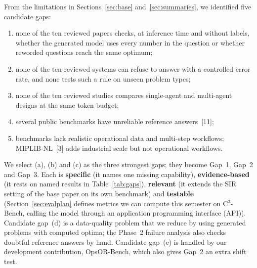 \documentclass[11pt,a4paper]{article}
\newcommand{\cthree}{C$^3$-Bench}
\begin{document}
From the limitations in Sections~\ref{sec:base} and~\ref{sec:summaries}, we identified five candidate gaps:
\begin{enumerate}[label=(\alph*),leftmargin=1.8em]
\item none of the ten reviewed papers checks, at inference time and without labels, whether the generated model uses every number in the question or whether reworded questions reach the same optimum;
\item none of the ten reviewed systems can refuse to answer with a controlled error rate, and none tests such a rule on unseen problem types;
\item none of the ten reviewed studies compares single-agent and multi-agent designs at the same token budget;
\item several public benchmarks have unreliable reference answers~[11];
\item benchmarks lack realistic operational data and multi-step workflows; MIPLIB-NL~[3] adds industrial scale but not operational workflows.
\end{enumerate}
We select (a), (b) and (c) as the three strongest gaps; they become Gap~1, Gap~2 and Gap~3. Each is \textbf{specific} (it names one missing capability), \textbf{evidence-based} (it rests on named results in Table~\ref{tab:gaps}), \textbf{relevant} (it extends the SIR setting of the base paper on its own benchmark) and \textbf{testable} (Section~\ref{sec:evalplan} defines metrics we can compute this semester on \cthree{}, calling the model through an application programming interface (API)). Candidate gap~(d) is a data-quality problem that we reduce by using generated problems with computed optima; the Phase~2 failure analysis also checks doubtful reference answers by hand. Candidate gap~(e) is handled by our development contribution, OpsOR-Bench, which also gives Gap~2 an extra shift test.
\end{document}
